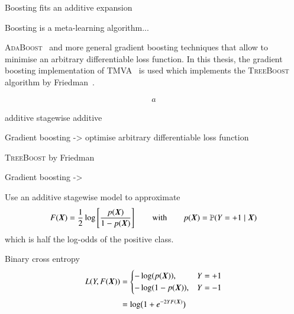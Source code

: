 Boosting fits an additive expansion






Boosting is a meta-learning algorithm...


\textsc{AdaBoost}~\cite{freund_shapire:adaboost,freund_shapire:adaboost2} and
more general gradient boosting techniques that allow to minimise an arbitrary
differentiable loss function.  In this thesis, the gradient boosting
implementation of TMVA~\cite{TMVA} is used which implements the
\textsc{TreeBoost} algorithm by Friedman~\cite{Friedman:2001wbq}.







\begin{align*}
  a
\end{align*}











additive stagewise additive



Gradient boosting -> optimise arbitrary differentiable loss function


\textsc{TreeBoost} by Friedman~\cite{Friedman:2000,Friedman:2001wbq}


Gradient boosting ->




Use an additive stagewise model to approximate
\begin{align*}
  F(\myvec{X}) = \frac{1}{2} \log\left[ \frac{p(\myvec{X})}{1 - p(\myvec{X})} \right] \qquad \text{with} \qquad p(\myvec{X}) = \mathbb{P}(Y = +1 \mid \myvec{X})
\end{align*}
which is half the log-odds of the positive class.


Binary cross entropy
\begin{align*}
  L(Y, F(\myvec{X})) &=
  \begin{cases}
    - \log( p(\myvec{X}) ), & Y = +1 \\
    - \log( 1 - p(\myvec{X}) ), & Y = -1
  \end{cases} \\[0.3em]
                     &= \log\bigl( 1 + e^{-2 Y F(\myvec{X})} \bigr)
\end{align*}



